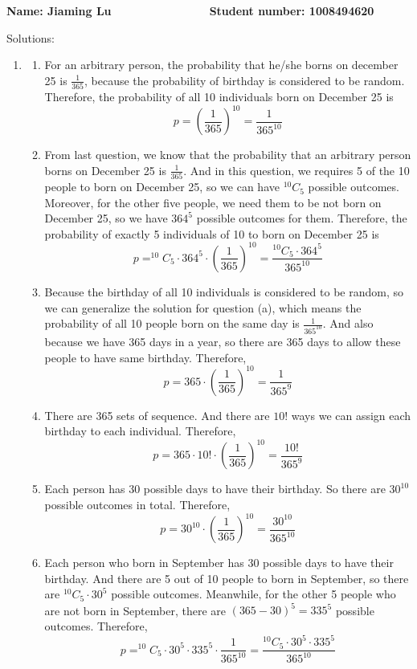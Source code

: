 \documentclass[a4paper, 12pt]{article}
\begin{document}
\textbf{Name: Jiaming Lu $~~~~~~~~~~~~~~~~~~~~~~~~~
~~~~~~~~~~~$ Student number: 1008494620}

Solutions:

\begin{enumerate}
	\item 
		\begin{enumerate}
	\item For an arbitrary person, the probability that he/she borns on december
		25 is $\frac{1}{365}$, because the probability of birthday is considered
		to be random. Therefore, the probability of all 10 individuals born
		on December 25 is 
		$$p = (\frac{1}{365})^{10} = \frac{1}{365^{10}}$$
	\item From last question, we know that the probability that an arbitrary
		person borns on December 25 is $\frac{1}{365}$. And in this question,
		we requires 5 of the 10 people to born on December 25, so we can have
		$^{10}C_5$ possible outcomes. Moreover, for the other five people, 
		we need them to be not born on December 25, so we have $364^5$ possible
		outcomes for them. Therefore, the probability of exactly 5 individuals
		of 10 to born on December 25 is 
		$$p = ^{10}C_5\cdot 364^5\cdot(\frac{1}{365})^{10} = 
		\frac{^{10}C_5\cdot 364^5}{365^{10}}$$
	\item Because the birthday of all 10 individuals is considered to be random,
		so we can generalize the solution for question (a), which means the 
		probability of all 10 people born on the same day is 
		$\frac{1}{365^{10}}$. And also because we have 365 days in a year, so 
		there are 365 days to allow these people to have same birthday.
		Therefore, 
		$$p = 365\cdot(\frac{1}{365})^{10} = \frac{1}{365^9}$$
	\item There are 365 sets of sequence. And there are $10!$ ways we can 
		assign each birthday to each individual. Therefore, 
		$$p = 365\cdot 10! \cdot (\frac{1}{365})^{10} = \frac{10!}{365^9}$$
	\item Each person has 30 possible days to have their birthday. So there are
		$30^{10}$ possible outcomes in total. Therefore, 
		$$p = 30^{10}\cdot(\frac{1}{365})^{10} = \frac{30^{10}}{365^{10}}$$
	\item Each person who born in September has 30 possible days to have
		their birthday. And there are 5 out of 10 people to born in September,
		so there are $^{10}C_5\cdot 30^5$ possible outcomes. Meanwhile, for the 
		other 5 people who are not born in September, there are 
		$(365-30)^5 = 335^5$ possible outcomes. Therefore, 
		$$p = ^{10}C_5\cdot 30^5 \cdot 335^5\cdot\frac{1}{365^{10}}
		= \frac{^{10}C_5\cdot 30^5 \cdot 335^5}{365^{10}}$$
\end{enumerate}
\end{enumerate}
\end{document}
